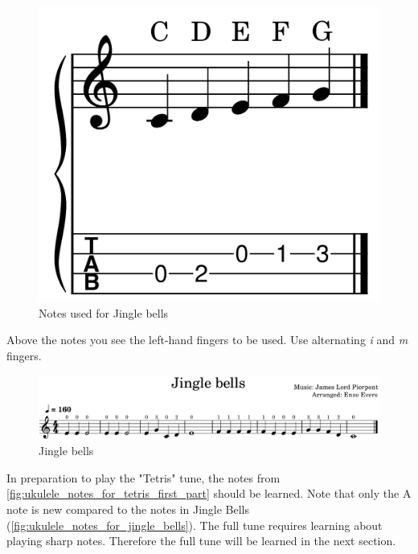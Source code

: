 \begin{figure}[h]
	\centering
	\includegraphics[height=0.12\textheight]{../../MuseScore/Ukulele/UkuleleNotesInJingleBells.png}
	\caption{Notes used for Jingle bells}
	\label{fig:ukulele_notes_for_jingle_bells}
\end{figure}

Above the notes you see the left-hand fingers to be used. Use alternating \textit{i} and \textit{m} fingers.

\begin{figure}[h]
	\centering
	\includegraphics[width=\textwidth]{../../MuseScore/Ukulele/UkuleleJingleBells.png}
	\caption{Jingle bells}
	\label{fig:ukulele_jingle_bells}
\end{figure}

\newpage

In preparation to play the "Tetris" tune, the notes from \autoref{fig:ukulele_notes_for_tetris_first_part} should be learned. Note that only the A note is new compared to the notes in Jingle Bells (\autoref{fig:ukulele_notes_for_jingle_bells}). The full tune requires learning about playing sharp notes. Therefore the full tune will be learned in the next section.

